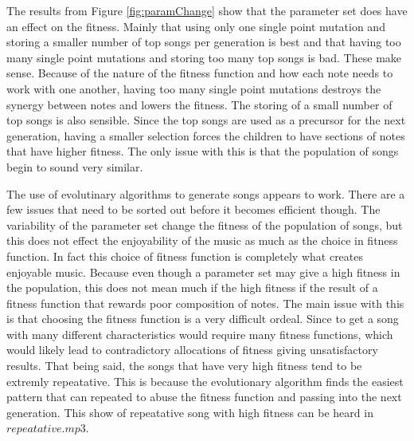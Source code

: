 \documentclass{article}
\begin{document}
The results from Figure \ref{fig:paramChange} show that the parameter set does have an effect on the fitness. Mainly that using only one single point mutation and storing a smaller number of top songs per generation is best and that having too many single point mutations and storing too many top songs is bad. These make sense. Because of the nature of the fitness function and how each note needs to work with one another, having too many single point mutations destroys the synergy between notes and lowers the fitness. The storing of a small number of top songs is also sensible. Since the top songs are used as a precursor for the next generation, having a smaller selection forces the children to have sections of notes that have higher fitness. The only issue with this is that the population of songs begin to sound very similar. 

The use of evolutinary algorithms to generate songs appears to work. There are a few issues that need to be sorted out before it becomes efficient though. The variability of the parameter set change the fitness of the population of songs, but this does not effect the enjoyability of the music as much as the choice in fitness function. In fact this choice of fitness function is completely what creates enjoyable music. Because even though a parameter set may give a high fitness in the population, this does not mean much if the high fitness if the result of a fitness function that rewards poor composition of notes. The main issue with this is that choosing the fitness function is a very difficult ordeal. Since to get a song with many different characteristics would require many fitness functions, which would likely lead to contradictory allocations of fitness giving unsatisfactory results. That being said, the songs that have very high fitness tend to be extremly repeatative. This is because the evolutionary algorithm finds the easiest pattern that can repeated to abuse the fitness function and passing into the next generation. This show of repeatative song with high fitness can be heard in $repeatative.mp3$.
\end{document}
